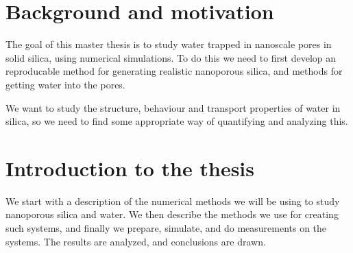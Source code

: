\chapter{Background and motivation}
The goal of this master thesis is to study water trapped in nanoscale pores in solid silica, using numerical simulations. To do this we need to first develop an reproducable method for generating realistic nanoporous silica, and methods for getting water into the pores. 

We want to study the structure, behaviour and transport properties of water in silica, so we need to find some appropriate way of quantifying and analyzing this.



\chapter{Introduction to the thesis}
We start with a description of the numerical methods we will be using to study nanoporous silica and water. We then describe the methods we use for creating such systems, and finally we prepare, simulate, and do measurements on the systems. The results are analyzed, and conclusions are drawn.

% 




